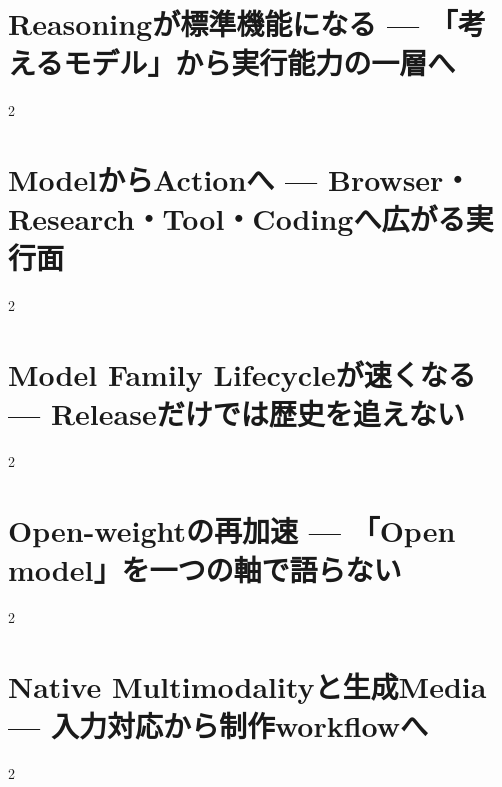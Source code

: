\documentclass[lualatex,a4paper,11pt]{jlreq}
\begin{document}
\surveycover
\clearpage


\clearpage
\section{Reasoningが標準機能になる — 「考えるモデル」から実行能力の一層へ}
\label{pkg:reasoning}

\medskip
\begin{multicols}{2}

\end{multicols}


\clearpage
\section{ModelからActionへ — Browser・Research・Tool・Codingへ広がる実行面}
\label{pkg:agents}

\medskip
\begin{multicols}{2}

\end{multicols}


\clearpage
\section{Model Family Lifecycleが速くなる — Releaseだけでは歴史を追えない}
\label{pkg:lifecycle}

\medskip
\begin{multicols}{2}

\end{multicols}


\clearpage
\section{Open-weightの再加速 — 「Open model」を一つの軸で語らない}
\label{pkg:open}

\medskip
\begin{multicols}{2}

\end{multicols}


\clearpage
\section{Native Multimodalityと生成Media — 入力対応から制作workflowへ}
\label{pkg:multimodal}

\medskip
\begin{multicols}{2}

\end{multicols}

\end{document}
